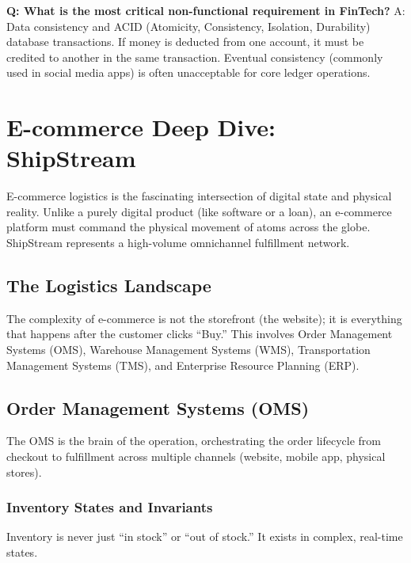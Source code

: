 \textbf{Q: What is the most critical non-functional requirement in
FinTech?} A: Data consistency and ACID (Atomicity, Consistency,
Isolation, Durability) database transactions. If money is deducted from
one account, it must be credited to another in the same transaction.
Eventual consistency (commonly used in social media apps) is often
unacceptable for core ledger operations.

\bigskip

\section{E-commerce Deep Dive:
ShipStream}\label{e-commerce-deep-dive-shipstream}

E-commerce logistics is the fascinating intersection of digital state
and physical reality. Unlike a purely digital product (like software or
a loan), an e-commerce platform must command the physical movement of
atoms across the globe. ShipStream represents a high-volume omnichannel
fulfillment network.

\subsection{The Logistics Landscape}\label{the-logistics-landscape}

The complexity of e-commerce is not the storefront (the website); it is
everything that happens after the customer clicks ``Buy.'' This involves
Order Management Systems (OMS), Warehouse Management Systems (WMS),
Transportation Management Systems (TMS), and Enterprise Resource
Planning (ERP).

\subsection{Order Management Systems
(OMS)}\label{order-management-systems-oms}

The OMS is the brain of the operation, orchestrating the order lifecycle
from checkout to fulfillment across multiple channels (website, mobile
app, physical stores).

\subsubsection{Inventory States and
Invariants}\label{inventory-states-and-invariants}

Inventory is never just ``in stock'' or ``out of stock.'' It exists in
complex, real-time states.

